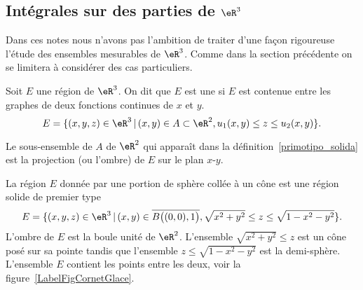 \subsection{Intégrales sur des parties de $\eR^3$}
Dans ces notes nous n'avons pas l'ambition de traiter d'une façon rigoureuse l'étude des ensembles mesurables de $\eR^3$. Comme dans la section précédente on se limitera à considérer des cas particuliers.
\begin{definition}\label{primotipo_solida}
	Soit $E$ une région de  $\eR^3$. On dit que $E$ est une  si $E$ est contenue entre les graphes de deux fonctions continues de $x$ et $y$.
\[
E=\{(x,y,z)\in\eR^3\, \vert \, (x,y)\in A\subset \eR^2, u_1(x,y)\leq z\leq u_2(x,y) \}.
\]
\end{definition}
Le sous-ensemble de $A$  de $\eR^2$ qui apparaît dans la définition~\ref{primotipo_solida} est la projection (ou l'ombre) de $E$ sur le plan $x$-$y$.

\begin{example}\label{cornet}
 La région $E$ donnée par une portion de sphère collée à un cône est une région solide de premier type
 \begin{equation}
     E=\{(x,y,z)\in\eR^3\, \vert \, (x,y)\in \overline{  B\big((0,0),1\big)}, \sqrt{x^2+y^2}\leq z\leq \sqrt{1-x^2-y^2} \}.
 \end{equation}
L'ombre de $E$ est la boule unité de $\eR^2$. L'ensemble $\sqrt{x^2+y^2}\leq z$ est un cône posé sur sa pointe tandis que l'ensemble $z\leq\sqrt{ 1-x^2-y^2 }$ est la demi-sphère. L'ensemble $E$ contient les points entre les deux, voir la figure~\ref{LabelFigCornetGlace}.
\newcommand{\CaptionFigCornetGlace}{Il faut voir ça en trois dimensions.}


\end{example}

